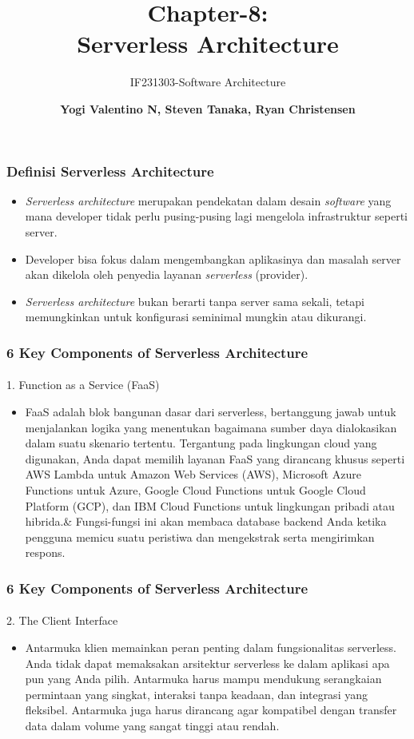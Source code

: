 \documentclass[aspectratio=169, table]{beamer}
\subtitle{IF231303-Software Architecture  \vspace{10pt}}
\title{\huge Chapter-8:\\Serverless Architecture}
\author{\textbf{Yogi Valentino N, Steven Tanaka, Ryan Christensen}}
\begin{document}
\begin{frame}[plain]
	\maketitle
\end{frame}

	\begin{frame}
        \frametitle{Definisi Serverless Architecture}
		\begin{itemize}
			\item \emph{Serverless architecture} merupakan pendekatan dalam desain \emph{software} yang mana developer tidak perlu pusing-pusing lagi mengelola infrastruktur seperti server.
			\item Developer bisa fokus dalam mengembangkan aplikasinya dan masalah server akan dikelola oleh penyedia layanan \emph{serverless} (provider).
			\item \emph{Serverless architecture} bukan berarti tanpa server sama sekali, tetapi memungkinkan untuk konfigurasi seminimal mungkin atau dikurangi.
		\end{itemize}
	\end{frame}

	\begin{frame}
    \frametitle{6 Key Components of Serverless Architecture}
	\framesubtitle{\hspace{1cm}}
		1. Function as a Service (FaaS)
		\begin{itemize}
			\item
			FaaS adalah blok bangunan dasar dari serverless, bertanggung jawab untuk menjalankan logika yang menentukan bagaimana sumber daya dialokasikan dalam suatu skenario tertentu.
			Tergantung pada lingkungan cloud yang digunakan, Anda dapat memilih layanan FaaS yang dirancang khusus seperti AWS Lambda untuk Amazon Web Services (AWS), Microsoft Azure Functions untuk Azure, Google Cloud Functions untuk Google Cloud Platform (GCP), dan IBM Cloud Functions untuk lingkungan pribadi atau hibrida.\&
			Fungsi-fungsi ini akan membaca database backend Anda ketika pengguna memicu suatu peristiwa dan mengekstrak serta mengirimkan respons.
		\end{itemize}
	\end{frame}

	\begin{frame}
        \frametitle{6 Key Components of Serverless Architecture}
			\framesubtitle{\hspace{1cm}}
		2. The Client Interface
		\begin{itemize}
			\item
			Antarmuka klien memainkan peran penting dalam fungsionalitas serverless. Anda tidak dapat memaksakan arsitektur serverless ke dalam aplikasi apa pun yang Anda pilih.
			Antarmuka harus mampu mendukung serangkaian permintaan yang singkat, interaksi tanpa keadaan, dan integrasi yang fleksibel.
			Antarmuka juga harus dirancang agar kompatibel dengan transfer data dalam volume yang sangat tinggi atau rendah.
		\end{itemize}
	\end{frame}
\end{document}
